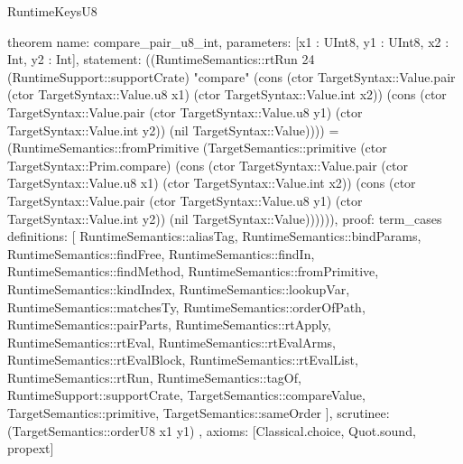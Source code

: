 \begin{lexlean}{RuntimeKeysU8}
\begin{semanticmodule}
theorem{
  name: compare_pair_u8_int,
  parameters: [x1 : UInt8, y1 : UInt8, x2 : Int, y2 : Int],
  statement: ((RuntimeSemantics::rtRun 24 (RuntimeSupport::supportCrate) "compare" (cons (ctor TargetSyntax::Value.pair (ctor TargetSyntax::Value.u8 x1) (ctor TargetSyntax::Value.int x2)) (cons (ctor TargetSyntax::Value.pair (ctor TargetSyntax::Value.u8 y1) (ctor TargetSyntax::Value.int y2)) (nil TargetSyntax::Value)))) = (RuntimeSemantics::fromPrimitive (TargetSemantics::primitive (ctor TargetSyntax::Prim.compare) (cons (ctor TargetSyntax::Value.pair (ctor TargetSyntax::Value.u8 x1) (ctor TargetSyntax::Value.int x2)) (cons (ctor TargetSyntax::Value.pair (ctor TargetSyntax::Value.u8 y1) (ctor TargetSyntax::Value.int y2)) (nil TargetSyntax::Value)))))),
  proof: term_cases{
    definitions: [
      RuntimeSemantics::aliasTag,
      RuntimeSemantics::bindParams,
      RuntimeSemantics::findFree,
      RuntimeSemantics::findIn,
      RuntimeSemantics::findMethod,
      RuntimeSemantics::fromPrimitive,
      RuntimeSemantics::kindIndex,
      RuntimeSemantics::lookupVar,
      RuntimeSemantics::matchesTy,
      RuntimeSemantics::orderOfPath,
      RuntimeSemantics::pairParts,
      RuntimeSemantics::rtApply,
      RuntimeSemantics::rtEval,
      RuntimeSemantics::rtEvalArms,
      RuntimeSemantics::rtEvalBlock,
      RuntimeSemantics::rtEvalList,
      RuntimeSemantics::rtRun,
      RuntimeSemantics::tagOf,
      RuntimeSupport::supportCrate,
      TargetSemantics::compareValue,
      TargetSemantics::primitive,
      TargetSemantics::sameOrder
    ],
    scrutinee: (TargetSemantics::orderU8 x1 y1)
  },
  axioms: [Classical.choice, Quot.sound, propext]
}


\end{semanticmodule}
\end{lexlean}
